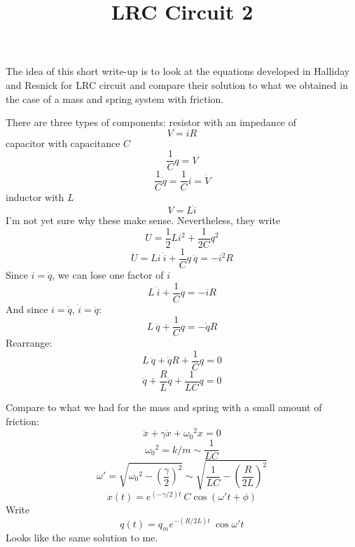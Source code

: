 \documentclass[11pt, oneside]{article}   	%
\title{LRC Circuit 2}
\date{}							%
\begin{document}
\maketitle
\Large
\noindent
The idea of this short write-up is to look at the equations developed in Halliday and Resnick for LRC circuit and compare their solution to what we obtained in the case of a mass and spring system with friction.

There are three types of components:  resistor with an impedance of
\[ V = iR \]
capacitor with capacitance $C$
\[ \frac{1}{C} q = V \]
\[ \frac{1}{C} \dot{q} = \frac{1}{C} i = \dot{V} \]
inductor with $L$
\[ V = L \dot{i} \]
I'm not yet sure why these make sense.  Nevertheless, they write
\[ U = \frac{1}{2}Li^2 + \frac{1}{2C}q^2\]
\[ \dot{U} = L i \ \dot{i} + \frac{1}{C} q \ \dot{q} = -i^2 R \]
Since $i = \dot{q}$, we can lose one factor of $i$
\[ L \ \dot{i} + \frac{1}{C} q = -i R \]
And since $i = \dot{q}$, $\dot{i} = \ddot{q}$:
\[ L \ \ddot{q} + \frac{1}{C} q = -\dot{q} R \]
Rearrange:
\[ L \ \ddot{q} + \dot{q} R + \frac{1}{C} q = 0 \]
\[ \ddot{q} + \frac{R}{L}\dot{q} + \frac{1}{LC} q = 0 \]

Compare to what we had for the mass and spring with a small amount of friction:
\[ \ddot{x} + \gamma \dot{x} + \omega_0{}^2 x = 0 \]
\[ \omega_0{}^2 = k/m \sim \frac{1}{LC} \]
\[ \omega' = \sqrt{\omega_0{}^2 - (\frac{\gamma}{2})^2} \sim \sqrt{\frac{1}{LC} - (\frac{R}{2L})^2}\]
\[ x(t) = e^{(-\gamma/2) t} \ C \cos(\omega't + \phi) \]
Write
\[ q(t) = q_m e^{-(R/2L) t} \ \cos \omega' t \]
Looks like the same solution to me.
\end{document}
